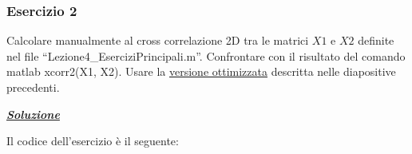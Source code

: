 \documentclass[a4paper]{article}
\newcommand{\dquotes}[1]{``#1''}
\begin{document}
	\subsubsection{Esercizio 2}
	
	Calcolare manualmente al cross correlazione 2D tra le matrici $X1$ e $X2$ definite nel file \dquotes{\textsf{Lezione4\_EserciziPrincipali.m}}. Confrontare con il risultato del comando matlab \textsf{xcorr2(X1, X2)}. Usare la \underline{versione ottimizzata} descritta nelle diapositive precedenti.\newline
	
	\noindent
	\textcolor{Green4}{\textbf{\underline{\emph{Soluzione}}}}\newline
	
	\noindent
	Il codice dell'esercizio è il seguente:
	
\end{document}
